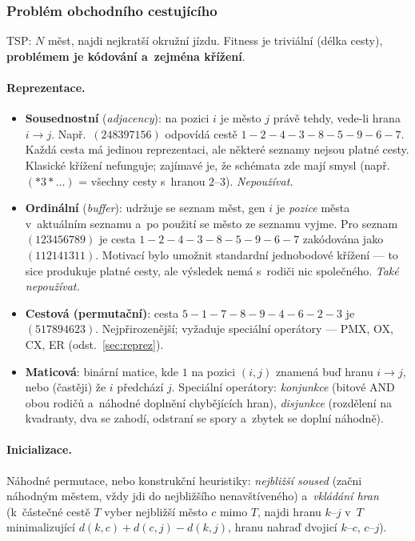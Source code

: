 \documentclass[11pt,a4paper]{article}
\theoremstyle{definition}
\begin{document}
\subsubsection{Problém obchodního cestujícího}

TSP: $N$ měst, najdi nejkratší okružní jízdu. Fitness je triviální (délka
cesty), \textbf{problémem je kódování a~zejména křížení}.

\paragraph{Reprezentace.}
\begin{itemize}
\item \textbf{Sousednostní} (\emph{adjacency}): na pozici $i$ je město $j$
  právě tehdy, vede-li hrana $i \to j$. Např.\ $(248397156)$ odpovídá cestě
  $1{-}2{-}4{-}3{-}8{-}5{-}9{-}6{-}7$. Každá cesta má jedinou reprezentaci,
  ale některé seznamy nejsou platné cesty. Klasické křížení nefunguje;
  zajímavé je, že schémata zde mají smysl (např.\ $(*3*\ldots)$ = všechny cesty
  s~hranou 2--3). \emph{Nepoužívat.}
\item \textbf{Ordinální} (\emph{buffer}): udržuje se seznam měst, gen $i$ je
  \emph{pozice} města v~aktuálním seznamu a~po použití se město ze seznamu
  vyjme. Pro seznam $(123456789)$ je cesta $1{-}2{-}4{-}3{-}8{-}5{-}9{-}6{-}7$
  zakódována jako $(112141311)$. Motivací bylo umožnit standardní jednobodové
  křížení --- to sice produkuje platné cesty, ale výsledek nemá s~rodiči nic
  společného. \emph{Také nepoužívat.}
\item \textbf{Cestová (permutační)}: cesta $5{-}1{-}7{-}8{-}9{-}4{-}6{-}2{-}3$
  je $(517894623)$. Nejpřirozenější; vyžaduje speciální operátory ---
  PMX, OX, CX, ER (odst.~\ref{sec:reprez}).
\item \textbf{Maticová}: binární matice, kde $1$ na pozici $(i,j)$ znamená buď
  hranu $i \to j$, nebo (častěji) že $i$ předchází $j$. Speciální operátory:
  \emph{konjunkce} (bitové AND obou rodičů a~náhodné doplnění chybějících hran),
  \emph{disjunkce} (rozdělení na kvadranty, dva se zahodí, odstraní se spory
  a~zbytek se doplní náhodně).
\end{itemize}

\paragraph{Inicializace.} Náhodné permutace, nebo konstrukční heuristiky:
\emph{nejbližší soused} (začni náhodným městem, vždy jdi do nejbližšího
nenavštíveného) a~\emph{vkládání hran} (k~částečné cestě $T$ vyber nejbližší
město $c$ mimo $T$, najdi hranu $k$--$j$ v~$T$ minimalizující
$d(k,c) + d(c,j) - d(k,j)$, hranu nahraď dvojicí $k$--$c$, $c$--$j$).
\end{document}
